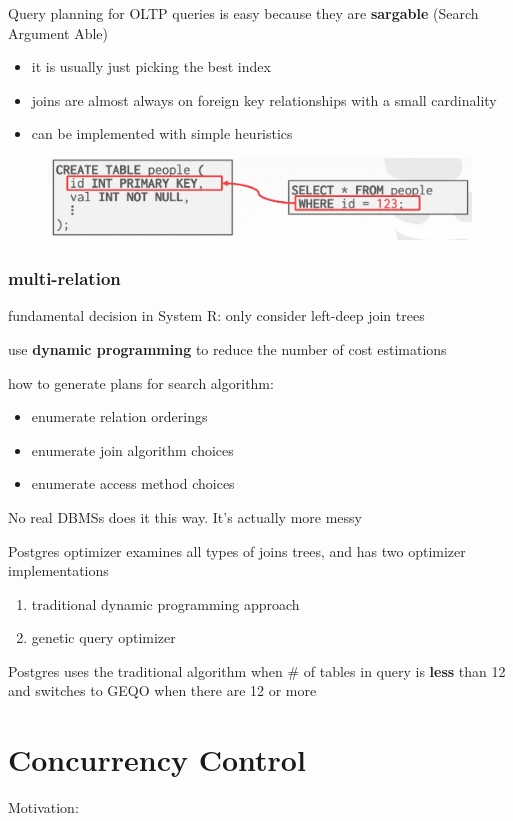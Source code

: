 \documentclass[11pt]{article}
\begin{document}
Query planning for OLTP queries is easy because they are \textbf{sargable} (Search Argument Able)
\begin{itemize}
\item it is usually just picking the best index
\item joins are almost always on foreign key relationships with a small cardinality
\item can be implemented with simple heuristics
\end{itemize}
\begin{figure}[htbp]
\centering
\includegraphics[width=.8\textwidth]{../images/15445/46.png}
\label{}
\end{figure}
\subsubsection{multi-relation}
\label{sec:org589f7d7}
fundamental decision in System R: only consider left-deep join trees

use \textbf{dynamic programming} to reduce the number of cost estimations

how to generate plans for search algorithm:
\begin{itemize}
\item enumerate relation orderings
\item enumerate join algorithm choices
\item enumerate access method choices
\end{itemize}

No real DBMSs does it this way. It's actually more messy

Postgres optimizer examines all types of joins trees, and has two optimizer implementations
\begin{enumerate}
\item traditional dynamic programming approach
\item genetic query optimizer
\end{enumerate}

Postgres uses the traditional algorithm when \# of tables in query is \textbf{less} than 12 and switches
to GEQO when there are 12 or more
\section{Concurrency Control}
\label{sec:org1aca1a0}
Motivation:
\end{document}
